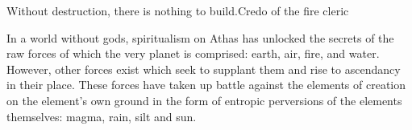 {Without destruction, there is nothing to build.}{Credo of the fire cleric}

In a world without gods, spiritualism on Athas has unlocked the secrets of the raw forces of which the very planet is comprised: earth, air, fire, and water. However, other forces exist which seek to supplant them and rise to ascendancy in their place. These forces have taken up battle against the elements of creation on the element's own ground in the form of entropic perversions of the elements themselves: magma, rain, silt and sun.

